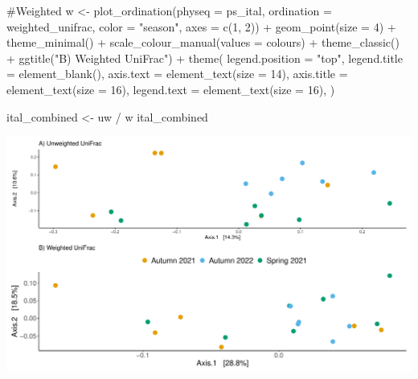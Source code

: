 \documentclass[
  letterpaper,
  DIV=11,
  numbers=noendperiod]{scrartcl}
\newenvironment{Shaded}{\begin{snugshade}}{\end{snugshade}}
\newcommand{\AttributeTok}[1]{\textcolor[rgb]{0.40,0.45,0.13}{#1}}
\newcommand{\CommentTok}[1]{\textcolor[rgb]{0.37,0.37,0.37}{#1}}
\newcommand{\DecValTok}[1]{\textcolor[rgb]{0.68,0.00,0.00}{#1}}
\newcommand{\FunctionTok}[1]{\textcolor[rgb]{0.28,0.35,0.67}{#1}}
\newcommand{\NormalTok}[1]{\textcolor[rgb]{0.00,0.23,0.31}{#1}}
\newcommand{\OtherTok}[1]{\textcolor[rgb]{0.00,0.23,0.31}{#1}}
\newcommand{\SpecialCharTok}[1]{\textcolor[rgb]{0.37,0.37,0.37}{#1}}
\newcommand{\StringTok}[1]{\textcolor[rgb]{0.13,0.47,0.30}{#1}}
\begin{document}
\begin{Shaded}
\begin{Highlighting}[]
\CommentTok{\#Weighted}
\NormalTok{w }\OtherTok{\textless{}{-}} \FunctionTok{plot\_ordination}\NormalTok{(}\AttributeTok{physeq =}\NormalTok{ ps\_ital,}
                \AttributeTok{ordination =}\NormalTok{ weighted\_unifrac,}
                \AttributeTok{color =} \StringTok{"season"}\NormalTok{,}
                \AttributeTok{axes =} \FunctionTok{c}\NormalTok{(}\DecValTok{1}\NormalTok{, }\DecValTok{2}\NormalTok{)) }\SpecialCharTok{+}
  \FunctionTok{geom\_point}\NormalTok{(}\AttributeTok{size =} \DecValTok{4}\NormalTok{) }\SpecialCharTok{+}
  \FunctionTok{theme\_minimal}\NormalTok{() }\SpecialCharTok{+}
  \FunctionTok{scale\_colour\_manual}\NormalTok{(}\AttributeTok{values =}\NormalTok{ colours) }\SpecialCharTok{+}
  \FunctionTok{theme\_classic}\NormalTok{() }\SpecialCharTok{+}
  \FunctionTok{ggtitle}\NormalTok{(}\StringTok{"B) Weighted UniFrac"}\NormalTok{) }\SpecialCharTok{+}
  \FunctionTok{theme}\NormalTok{(}
    \AttributeTok{legend.position =} \StringTok{"top"}\NormalTok{,}
    \AttributeTok{legend.title =} \FunctionTok{element\_blank}\NormalTok{(),}
    \AttributeTok{axis.text =} \FunctionTok{element\_text}\NormalTok{(}\AttributeTok{size =} \DecValTok{14}\NormalTok{),}
    \AttributeTok{axis.title =} \FunctionTok{element\_text}\NormalTok{(}\AttributeTok{size =} \DecValTok{16}\NormalTok{),}
    \AttributeTok{legend.text =} \FunctionTok{element\_text}\NormalTok{(}\AttributeTok{size =} \DecValTok{16}\NormalTok{),}
\NormalTok{    ) }

\NormalTok{ital\_combined }\OtherTok{\textless{}{-}}\NormalTok{ uw }\SpecialCharTok{/}\NormalTok{ w}
\NormalTok{ital\_combined}
\end{Highlighting}
\end{Shaded}

\includegraphics{code_files/figure-pdf/unnamed-chunk-7-2.pdf}
\end{document}
